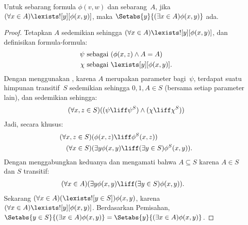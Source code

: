 \documentclass[../../../include/open-logic-section]{subfiles}
\begin{document}
\begin{thm}\label{thm:replacement}
Untuk sebarang formula $\phi(v,w)$ dan sebarang~$A$, jika
$(\forall x\in A)\lexists![y][\phi(x,y)]$, maka
$\Setabs{y}{(\exists x\in A)\phi(x,y)}$ ada.
\end{thm}

\begin{proof}
Tetapkan $A$ sedemikian sehingga
$(\forall x\in A)\lexists![y][\phi(x,y)]$, dan definisikan formula-formula:
\begin{align*}
	\psi &\text{ sebagai } (\phi(x, z) \land A = A)\\
	\chi &\text{ sebagai } \lexists[y][\phi(x, y)].
\end{align*}
Dengan menggunakan , karena $A$ merupakan parameter
bagi~$\psi$, terdapat suatu himpunan transitif~$S$ sedemikian sehingga
$0,1,A\in S$ (bersama setiap parameter lain), dan sedemikian sehingga:
\[
	(\forall x,z \in S)((\psi \liff \psi^S) \land (\chi \liff \chi^S))
\]
Jadi, secara khusus:
\begin{align*}
	(\forall  x, z \in S)(&\phi(x, z) \liff \phi^S(x, z))\\
	(\forall x \in S)(&\exists y\phi(x, y) \liff (\exists y \in S)\phi^S(x, y)).
\end{align*}
Dengan menggabungkan keduanya dan mengamati bahwa $A\subseteq S$ karena
$A\in S$ dan $S$ transitif:
\begin{align*}
	(\forall x \in A)(&\exists y\phi(x, y) \liff (\exists y \in S)\phi(x, y)).
\end{align*}
Sekarang $(\forall x\in A)(\lexists![y\in S])\phi(x,y)$, karena
$(\forall x\in A)\lexists![y][\phi(x,y)]$. Berdasarkan Pemisahan,
$\Setabs{y\in S}{(\exists x\in A)\phi(x,y)}
=\Setabs{y}{(\exists x\in A)\phi(x,y)}$.
\end{proof}
\end{document}
